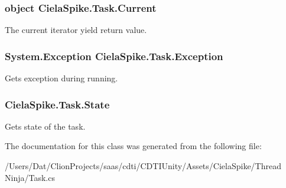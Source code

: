 \subsubsection[{\texorpdfstring{Current}{Current}}]{\setlength{\rightskip}{0pt plus 5cm}object Ciela\+Spike.\+Task.\+Current\hspace{0.3cm}{\ttfamily [get]}}\hypertarget{class_ciela_spike_1_1_task_a1b998f7aa927571627df0e146693c5a4}{}\label{class_ciela_spike_1_1_task_a1b998f7aa927571627df0e146693c5a4}


The current iterator yield return value. 

\subsubsection[{\texorpdfstring{Exception}{Exception}}]{\setlength{\rightskip}{0pt plus 5cm}System.\+Exception Ciela\+Spike.\+Task.\+Exception\hspace{0.3cm}{\ttfamily [get]}}\hypertarget{class_ciela_spike_1_1_task_a16f755d6c2d90b3d528aebc7526a0a2b}{}\label{class_ciela_spike_1_1_task_a16f755d6c2d90b3d528aebc7526a0a2b}


Gets exception during running. 

\subsubsection[{\texorpdfstring{State}{State}}]{ Ciela\+Spike.\+Task.\+State\hspace{0.3cm}{\ttfamily [get]}}\hypertarget{class_ciela_spike_1_1_task_a0b9fb190966ab28515afb40541ba23cf}{}\label{class_ciela_spike_1_1_task_a0b9fb190966ab28515afb40541ba23cf}


Gets state of the task. 



The documentation for this class was generated from the following file\+:\begin{DoxyCompactItemize}
\item 
/\+Users/\+Dat/\+Clion\+Projects/saas/cdti/\+C\+D\+T\+I\+Unity/\+Assets/\+Ciela\+Spike/\+Thread Ninja/Task.\+cs\end{DoxyCompactItemize}
